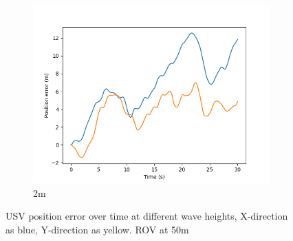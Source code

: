 \documentclass[class=article, crop=false]{standalone}
\begin{document}
\begin{figure}
\begin{subfigure}[b]{0.48\textwidth}
        \includegraphics{scenario1/rov-50m/2.0m/usv_pos_error_controlled}
        \caption{2m}
        \label{}
    \end{subfigure}
    \caption{USV position error over time at different wave heights, X-direction as blue, Y-direction as yellow. ROV at 50m}
    \label{}
\end{figure}
\end{document}
